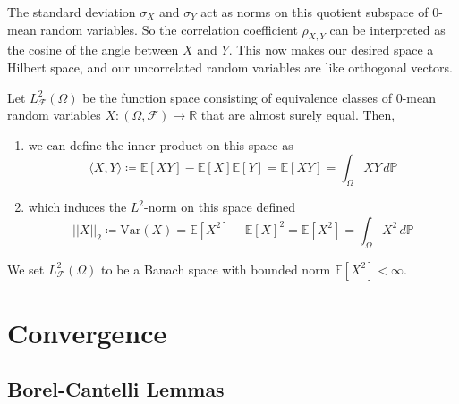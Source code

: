 \documentclass{article}
\begin{document}
      The standard deviation $\sigma_X$ and $\sigma_Y$ act as norms on this quotient subspace of $0$-mean random variables. So the correlation coefficient $\rho_{X, Y}$ can be interpreted as the cosine of the angle between $X$ and $Y$. This now makes our desired space a Hilbert space, and our uncorrelated random variables are like orthogonal vectors. 

      \begin{definition}
        Let $L^2_\mathcal{F} (\Omega)$ be the function space consisting of equivalence classes of $0$-mean random variables $X: (\Omega, \mathcal{F}) \rightarrow \mathbb{R}$ that are almost surely equal. Then, 
        \begin{enumerate}
          \item we can define the inner product on this space as 
          \begin{equation}
            \langle X, Y \rangle \coloneqq \mathbb{E}[X Y] - \mathbb{E}[X] \mathbb{E}[Y] = \mathbb{E}[X Y] = \int_\Omega X Y \,d\mathbb{P}
          \end{equation}

          \item which induces the $L^2$-norm on this space defined 
          \begin{equation}
            ||X||_2 \coloneqq \mathrm{Var}(X) = \mathbb{E}[X^2] - \mathbb{E}[X]^2 = \mathbb{E}[X^2] = \int_\Omega X^2 \,d\mathbb{P}
          \end{equation}
        \end{enumerate}
        We set $L^2_\mathcal{F} (\Omega)$ to be a Banach space with bounded norm $\mathbb{E}[X^2] < \infty$. 
      \end{definition}

\section{Convergence}

  \subsection{Borel-Cantelli Lemmas}
\end{document}

